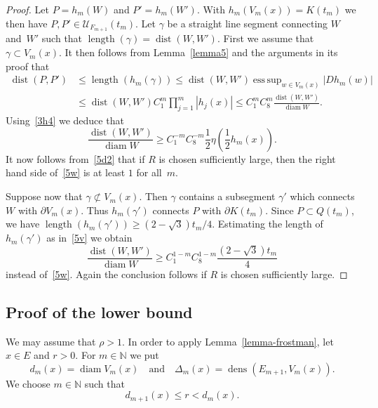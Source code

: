 \documentclass[12pt,a4paper]{amsart}
\theoremstyle{plain}
\theoremstyle{definition}
\theoremstyle{remark}
\newcommand{\diam}{\operatorname{diam}}
\DeclareMathOperator*{\esssup}{ess\,sup}
\def\N{\mathbb N}
\def\cU{\mathcal U}
\def\dens{\operatorname{dens}}
\def\dist{\operatorname{dist}}
\def\length{\operatorname{length}}
\numberwithin{equation}{section}
\begin{document}
\begin{proof}
Let $P=h_m(W)$ and $P'=h_m(W')$. With $h_m(V_m(x))=K(t_m)$ we then have 
$P,P'\in \cU_{F_{m+1}}(t_m)$. 
Let $\gamma$ be a straight line segment connecting $W$ and~$W'$
such that $\length(\gamma)=\dist(W,W')$.
First we assume that $\gamma\subset V_m(x)$.
It then follows from Lemma~\ref{lemma5} and the arguments in its proof
that
\begin{equation}\label{5v}
\begin{aligned}
\dist(P,P')
&\leq \length (h_m(\gamma)) \leq \dist(W,W') \esssup_{w\in V_{m}(x)} |Dh_m(w)|
\\ &
\leq \dist(W,W')  C_1^{m} \prod_{j=1}^{m}|h_j(x)|  
\leq C_1^{m} C_8^{m} \frac{\dist(W,W')}{\diam W} .
\end{aligned}
\end{equation}
Using~\eqref{3h4} we deduce that
\begin{equation}\label{5w}
\frac{ \dist(W,W')}{\diam W}  \geq  C_1^{-m} C_8^{-m}\frac12 \eta\!\left(\frac12 h_m(x)\right).
\end{equation}
It now follows from~\eqref{5d2} that if $R$ is chosen sufficiently large, 
then the right hand side of~\eqref{5w} is at least $1$ for all~$m$.

Suppose now that  $\gamma\not\subset V_m(x)$.
Then $\gamma$ contains a subsegment $\gamma'$ which connects $W$ with $\partial V_m(x)$.
Thus $h_m(\gamma')$ connects $P$ with $\partial K(t_m)$. Since $P\subset Q(t_m)$,
we have $\length(h_m(\gamma'))\geq (2-\sqrt{3})t_m/4$. Estimating the length
of $h_m(\gamma')$ 
as in~\eqref{5v} we obtain
\begin{equation}\label{5w1}
\frac{ \dist(W,W')}{\diam W}  \geq  C_1^{1-m} C_8^{1-m}\frac{(2-\sqrt{3})t_m}{4}
\end{equation}
instead of~\eqref{5w}. Again the conclusion follows if $R$ is chosen
sufficiently large.
\end{proof}
\subsection{Proof of the lower bound}
We may assume that $\rho>1$. 
In order to apply Lemma~\ref{lemma-frostman}, let $x\in E$ and $r>0$. 
For $m\in\N$ we put 
\begin{equation}\label{4a0}
d_m(x)=\diam V_m(x)
\quad\text{and}\quad
\Delta_m(x)=\dens(E_{m+1},V_m(x)).
\end{equation}
We choose $m\in\N$ such that 
\begin{equation}\label{4a}
d_{m+1}(x)\leq r< d_m(x).
\end{equation}
\end{document}
